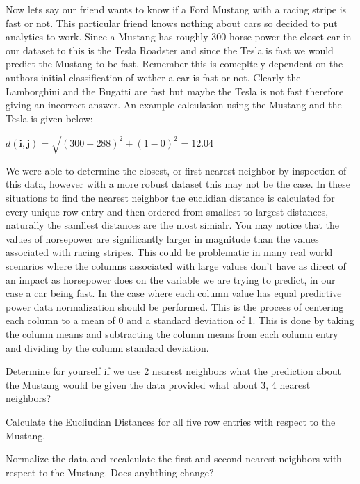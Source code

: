 Now lets say our friend wants to know if a Ford Mustang with a racing
stripe is fast or not. This particular friend knows nothing about cars
so decided to put analytics to work. Since a Mustang has roughly 300
horse power the closet car in our dataset to this is the Tesla
Roadster and since the Tesla is fast we would predict the Mustang to
be fast. Remember this is comepltely dependent on the authors initial
classification of wether a car is fast or not. Clearly the Lamborghini
and the Bugatti are fast but maybe the Tesla is not fast therefore
giving an incorrect answer. An example calculation using the Mustang
and the Tesla is given below: 

${d(\mathbf{i},\mathbf{j})}  =
\sqrt{{(300 - 288)^2 + (1 - 0)^2 } }  = 12.04 $

We were able to determine the closest, or first nearest neighbor by
inspection of this data, however with a more robust dataset this may
not be the case. In these situations to find the nearest neighbor the
euclidian distance is calculated for every unique row entry and then
ordered from smallest to largest distances, naturally the samllest
distances are the most simialr. You may notice that the values of
horsepower are significantly larger in magnitude than the values
associated with racing stripes. This could be problematic in many real
world scenarios where the columns associated with large values don't
have as direct of an impact as horsepower does on the variable we are
trying to predict, in our case a car being fast. In the case where
each column value has equal predictive power data normalization should
be performed. This is the process of centering each column to a mean
of 0 and a standard deviation of 1. This is done by taking the column
means and subtracting the column means from each column entry and
dividing by the column standard deviation. 

\begin{exercise} Determine for yourself if we use 2 nearest neighbors what the
prediction about the Mustang would be given the data provided what
about 3, 4  nearest neighbors? 
\end{exercise}

\begin{exercise} Calculate the Eucliudian Distances for all five row
  entries with respect to the Mustang.
\end{exercise}

\begin{exercise} Normalize the data and recalculate the first and
  second nearest neighbors with respect to the Mustang. Does anyhthing
  change? 
\end{exercise}

